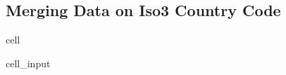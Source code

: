 \documentclass[letterpaper,10pt,english]{jupyterBook}
\begin{document}
\subsection{Merging Data on Iso3 Country Code}
\label{\detokenize{notebooks/replicating_paper:id2}}
\begin{sphinxuseclass}{cell}\begin{sphinxVerbatimInput}

\begin{sphinxuseclass}{cell_input}
\begin{sphinxVerbatim}[commandchars=\\\{\}]
     
\end{sphinxVerbatim}

\end{sphinxuseclass}\end{sphinxVerbatimInput}

\end{sphinxuseclass}
\end{document}
